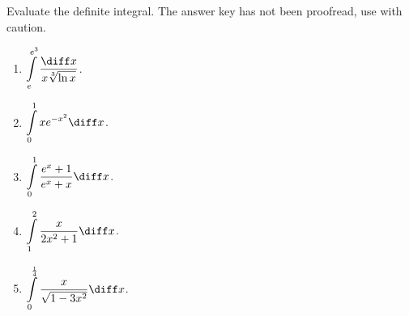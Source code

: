 Evaluate the definite integral. The answer key has not been proofread, use with caution.
\begin{enumerate}[ref={\fcProblemRef}]
\item $\displaystyle\int\limits_{e}^{e^3}\frac{\diff x}{x \sqrt[3]{\ln x}} $.

\item $\displaystyle\int\limits_{0}^{1}xe^{-x^2} \diff x$.

\item $\displaystyle\int\limits_{0}^{1}\frac{e^x+1}{e^x+x} \diff x$.

\item \label{problemIntx/(2x^2+1)} $\displaystyle\int\limits_{1}^{2} \frac{x}{2x^2+1 }  \diff x$.

\item $\displaystyle\int\limits_{0}^{\frac{1}4}\frac{x }{\sqrt{1-3x^2}}\diff x$.


\end{enumerate}
